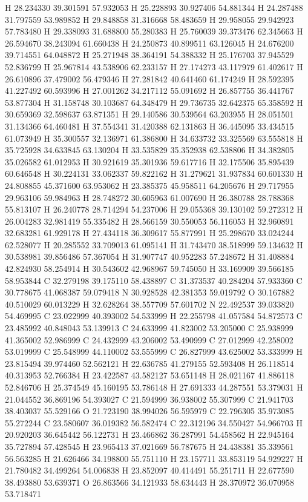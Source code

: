 \documentclass{article}
\begin{document}
H 28.234330 39.301591 57.932053 
H 25.228893 30.927406 54.881344 
H 24.287488 31.797559 53.989852 
H 29.848858 31.316668 58.483659 
H 29.958055 29.942923 57.783480 
H 29.338093 31.688800 55.280383 
H 25.760039 39.373476 62.345663 
H 26.594670 38.243094 61.660438 
H 24.250873 40.899511 63.126045 
H 24.676200 39.714551 64.048872 
H 25.271948 38.364191 54.388332 
H 25.176703 37.945529 52.836799 
H 25.967814 43.538906 62.233157 
H 27.174273 43.117979 61.402617 
H 26.610896 37.479002 56.479346 
H 27.281842 40.641460 61.174249 
H 28.592395 41.227492 60.593996 
H 27.001262 34.217112 55.091692 
H 26.857755 36.441767 53.877304 
H 31.158748 30.103687 64.348479 
H 29.736735 32.642375 65.358592 
H 30.659369 32.598637 63.871351 
H 29.140586 30.539564 63.203955 
H 28.051501 31.134366 64.460481 
H 37.554341 31.420388 62.131863 
H 36.445095 33.434515 61.073949 
H 35.300557 32.136971 61.386800 
H 34.633732 33.325569 63.555818 
H 35.725928 34.633845 63.130204 
H 33.535829 35.352938 62.538806 
H 34.382805 35.026582 61.012953 
H 30.921619 35.301936 59.617716 
H 32.175506 35.895439 60.646548 
H 30.224131 33.062337 59.822162 
H 31.279621 31.937834 60.601330 
H 24.808855 45.371600 63.953062 
H 23.385375 45.958511 64.205676 
H 29.717955 29.963106 59.984963 
H 28.748272 30.605963 61.007690 
H 26.380788 28.788368 55.813107 
H 26.240778 28.714294 54.237006 
H 29.055368 39.130102 59.272312 
H 26.004283 32.981419 55.335482 
H 28.566159 30.550053 56.116053 
H 32.960891 32.683281 61.929178 
H 27.434118 36.309617 55.877991 
H 25.298670 33.024244 62.528077 
H 20.285552 33.709013 61.095141 
H 31.743470 38.518999 59.134632 
H 30.538981 39.856486 57.367054 
H 31.907747 40.952283 57.248672 
H 31.408884 42.824930 58.254914 
H 30.543602 42.968967 59.745050 
H 33.169909 39.566185 58.953844 
C 32.279198 39.175110 58.438897 
C 31.373537 40.284204 57.933360 
C 30.778675 41.068387 59.079418 
N 30.928528 42.381353 59.019792 
O 30.167882 40.510029 60.013229 
H 32.628264 38.557709 57.601702 
N 22.492537 39.033820 54.469995 
C 23.022999 40.393002 54.533999 
H 22.255798 41.057584 54.872573 
C 23.485992 40.848043 53.139913 
C 24.633999 41.823002 53.205000 
C 25.938999 41.365002 52.986999 
C 24.432999 43.206002 53.490999 
C 27.012999 42.258002 53.019999 
C 25.548999 44.110002 53.555999 
C 26.827999 43.625002 53.333999 
H 23.815494 39.974460 52.562121 
H 22.636785 41.279155 52.593408 
H 26.118514 40.313953 52.766384 
H 23.422587 43.582127 53.651148 
H 28.021167 41.886118 52.846706 
H 25.374549 45.160195 53.786148 
H 27.691333 44.287551 53.379031 
H 21.044552 36.869196 54.393027 
C 21.594999 36.938002 55.307999 
C 21.941703 38.403037 55.529166 
O 21.723190 38.994026 56.595979 
C 22.796305 35.973085 55.272244 
C 23.580607 36.019382 56.582474 
C 22.312196 34.550427 54.966703 
H 20.920203 36.645442 56.122731 
H 23.466862 36.287991 54.458562 
H 22.945164 35.727894 57.428545 
H 23.965413 37.021669 56.787675 
H 24.438381 35.339561 56.563285 
H 21.626466 34.198800 55.751110 
H 23.157711 33.853119 54.929227 
H 21.780482 34.499264 54.006838 
H 23.852097 40.414491 55.251711 
H 22.677590 38.493880 53.639371 
O 26.863566 34.121933 58.634443 
H 28.370972 36.070958 53.718471 
~     
    
\end{document}
